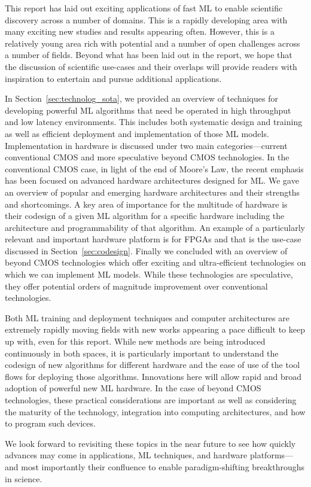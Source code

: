 
This report has laid out exciting applications of fast ML to enable scientific discovery across a number of domains.  
This is a rapidly developing area with many exciting new studies and results  appearing often.  
However, this is a relatively young area rich with potential and a number of open challenges across a number of fields.  
Beyond what has been laid out in the report, we hope that the discussion of scientific use-cases and their overlaps will provide readers with inspiration to entertain and pursue additional applications.  

In Section~\ref{sec:technolog_sota}, we provided an overview of techniques for developing powerful ML algorithms that need be operated in high throughput and low latency environments.  
This includes both systematic design and training as well as efficient deployment and implementation of those ML models.  
Implementation in hardware is discussed under two main categories---current conventional CMOS and more speculative beyond CMOS technologies.  In the conventional CMOS case,  in light of the end of Moore's Law, the recent emphasis has been focused on advanced hardware architectures designed for ML.  
We gave an overview of popular and emerging hardware architectures and their strengths and shortcomings. 
A key area of importance for the multitude of hardware is their codesign of a given ML algorithm for a specific hardware including the architecture and programmability of that algorithm.  
An example of a particularly relevant and important hardware platform is for FPGAs and that is the use-case discussed in Section~\ref{sec:codesign}.  
Finally we concluded with an overview of beyond CMOS technologies which offer exciting and ultra-efficient technologies on which we can implement ML models.  
While these technologies are speculative, they offer potential orders of magnitude improvement over conventional technologies.

Both ML training and deployment techniques and computer architectures are extremely rapidly moving fields with new works appearing a pace difficult to keep up with, even for this report.  
While new methods are being introduced continuously in both spaces, it is particularly important to understand the codesign of new algorithms for different hardware and the ease of use of the tool flows for deploying those algorithms.  
Innovations here will allow rapid and broad adoption of powerful new ML hardware.  
In the case of beyond CMOS technologies, these practical considerations are important as well as considering the maturity of the technology, integration into computing architectures, and how to program such devices.  

We look forward to revisiting these topics in the near future to see how quickly advances may come in applications, ML techniques, and hardware platforms---and most importantly their confluence to enable paradigm-shifting breakthroughs in science.

